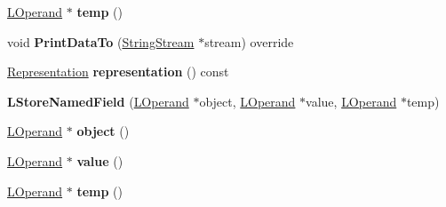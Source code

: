 \begin{DoxyCompactItemize}
\item 
\hyperlink{classv8_1_1internal_1_1_l_operand}{L\+Operand} $\ast$ {\bfseries temp} ()\hypertarget{classv8_1_1internal_1_1_l_store_named_field_ad77491ce510eaa0f150539ec8815c14f}{}\label{classv8_1_1internal_1_1_l_store_named_field_ad77491ce510eaa0f150539ec8815c14f}

\item 
void {\bfseries Print\+Data\+To} (\hyperlink{classv8_1_1internal_1_1_string_stream}{String\+Stream} $\ast$stream) override\hypertarget{classv8_1_1internal_1_1_l_store_named_field_a737f49c6847cd030f17c69b314c54b6c}{}\label{classv8_1_1internal_1_1_l_store_named_field_a737f49c6847cd030f17c69b314c54b6c}

\item 
\hyperlink{classv8_1_1internal_1_1_representation}{Representation} {\bfseries representation} () const \hypertarget{classv8_1_1internal_1_1_l_store_named_field_acf09ef122d9ca6738894c92b8f3e24ef}{}\label{classv8_1_1internal_1_1_l_store_named_field_acf09ef122d9ca6738894c92b8f3e24ef}

\item 
{\bfseries L\+Store\+Named\+Field} (\hyperlink{classv8_1_1internal_1_1_l_operand}{L\+Operand} $\ast$object, \hyperlink{classv8_1_1internal_1_1_l_operand}{L\+Operand} $\ast$value, \hyperlink{classv8_1_1internal_1_1_l_operand}{L\+Operand} $\ast$temp)\hypertarget{classv8_1_1internal_1_1_l_store_named_field_a6d2a4f20bdb4927c9401f7f7dd706d15}{}\label{classv8_1_1internal_1_1_l_store_named_field_a6d2a4f20bdb4927c9401f7f7dd706d15}

\item 
\hyperlink{classv8_1_1internal_1_1_l_operand}{L\+Operand} $\ast$ {\bfseries object} ()\hypertarget{classv8_1_1internal_1_1_l_store_named_field_a322fe15f20a68dfd3429f31bb46ce109}{}\label{classv8_1_1internal_1_1_l_store_named_field_a322fe15f20a68dfd3429f31bb46ce109}

\item 
\hyperlink{classv8_1_1internal_1_1_l_operand}{L\+Operand} $\ast$ {\bfseries value} ()\hypertarget{classv8_1_1internal_1_1_l_store_named_field_a7c1b623b85070a53e7c8ca36113808c7}{}\label{classv8_1_1internal_1_1_l_store_named_field_a7c1b623b85070a53e7c8ca36113808c7}

\item 
\hyperlink{classv8_1_1internal_1_1_l_operand}{L\+Operand} $\ast$ {\bfseries temp} ()\hypertarget{classv8_1_1internal_1_1_l_store_named_field_ad77491ce510eaa0f150539ec8815c14f}{}\label{classv8_1_1internal_1_1_l_store_named_field_ad77491ce510eaa0f150539ec8815c14f}


\end{DoxyCompactItemize}
